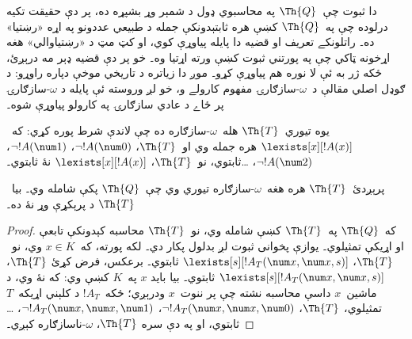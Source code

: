 \documentclass[../../../include/open-logic-section]{subfiles}
\begin{document}


\begin{explain}
دا ثبوت چې~$\Th{Q}$ په محاسبوي ډول د شمېر وړ بشپړه ده، پر دې حقيقت
تکيه درلوده چې په~$\Th{Q}$ کښې هره ثابتېدونکې جمله د طبيعي عددونو
په اړه «رښتيا» ده۔ راتلونکے تعريف او قضيه دا پايله پياوړې کوي، او
کټ مټ د «رښتياوالي» هغه اړخونه ټاکي چې په پورتني ثبوت کښې ورته
اړتيا وه۔ خو پر دې قضيه ډېر مه درېږئ، ځکه ژر به ئې لا نوره هم
پياوړې کړو۔ موږ دا زياتره د تاريخي موخې دپاره راوړو: د ګوډل اصلي
مقالې د~$\omega$-سازګارۍ مفهوم کارولے و، خو لږ وروسته ئې پايله د
$\omega$-سازګارۍ پر ځاے د عادي سازګارۍ په کارولو پياوړې شوه۔
\end{explain}

\begin{defn}
يوه تيوري~$\Th{T}$ هله~$\omega$-سازګاره ده چې لاندې شرط پوره کړي:
که~$\lexists[x][!A(x)]$ هره جمله وي او~$\Th{T}$،
$\lnot !A(\num 0)$، $\lnot !A(\num 1)$، $\lnot !A(\num 2)$،
\dots ثابتوي، نو~$\Th{T}$، $\lexists[x][!A(x)]$ نۀ ثابتوي۔
\end{defn}

\begin{thm}
  پرېږدئ~$\Th{T}$ هره هغه~$\omega$-سازګاره تيوري وي چې~$\Th{Q}$
  پکې شامله وي۔ بيا~$\Th{T}$ د پرېکړې وړ نۀ ده۔
\end{thm}

\begin{proof}
که~$\Th{Q}$ په~$\Th{T}$ کښې شامله وي، نو~$\Th{T}$ محاسبه کېدونکې
تابعې او اړيکې تمثيلوي۔ يوازې پخوانی ثبوت لږ بدلول پکار دي۔ لکه
پورته، که~$x \in K$ وي، نو~$\Th{T}$،
$\lexists[s][!A_T(\num x,\num x, s)]$ ثابتوي۔ برعکس، فرض کړئ
$\Th{T}$، $\lexists[s][!A_T(\num x, \num x, s)]$ ثابتوي۔ بيا بايد
$x$ په~$K$ کښې وي: که نۀ وي، د ماشين~$x$ داسې محاسبه نشته چې پر
ننوت~$x$ ودرېږي؛ ځکه~$!A_T$ د کلېني اړيکه~$T$ تمثيلوي، $\Th{T}$،
$\lnot !A_T(\num x, \num x, \num 0)$،
$\lnot !A_T(\num x, \num x, \num 1)$، \dots ثابتوي، او په دې سره
$\Th{T}$، $\omega$-ناسازګاره کېږي۔
\end{proof}
\end{document}
